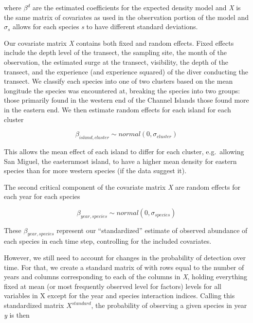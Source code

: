 \documentclass[]{article}
\begin{document}
where \(\beta^{d}\) are the estimated coefficients for the expected density model and \emph{X} is the same matrix of covariates as used in the observation portion of the model and \(\sigma_s\) allows for each species \emph{s} to have different standard deviations.

Our covariate matrix \emph{X} contains both fixed and random effects. Fixed effects include the depth level of the transect, the sampling site, the month of the observation, the estimated surge at the transect, visibility, the depth of the transect, and the experience (and experience squared) of the diver conducting the transect. We classify each species into one of two clusters based on the mean longitude the species was encountered at, breaking the species into two groups: those primarily found in the western end of the Channel Islands those found more in the eastern end. We then estimate random effects for each island for each cluster

\begin{equation}
\beta_{island,cluster} \sim normal(0,\sigma_{cluster})
  \label{eq:island}
\end{equation}

This allows the mean effect of each island to differ for each cluster, e.g.~allowing San Miguel, the easternmost island, to have a higher mean density for eastern species than for more western species (if the data suggest it).

The second critical component of the covariate matrix \emph{X} are random effects for each year for each species

\begin{equation}
  \beta_{year,species} \sim normal(0,\sigma_{species})
  \label{eq:species}
\end{equation}

These \(\beta_{year,species}\) represent our ``standardized'' estimate of observed abundance of each species in each time step, controlling for the included covariates.

However, we still need to account for changes in the probability of detection over time. For that, we create a standard matrix of with rows equal to the number of years and columns corresponding to each of the columns in \emph{X}, holding everything fixed at mean (or most frequently observed level for factors) levels for all variables in X except for the year and species interaction indices. Calling this standardized matrix \(X^{standard}\), the probability of observing a given species in year \emph{y} is then
\end{document}
